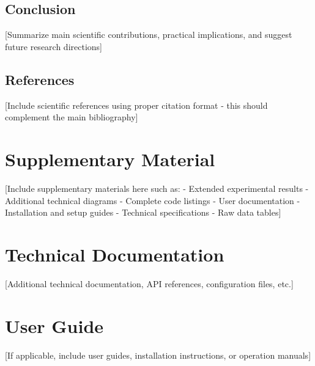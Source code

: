 \documentclass[11pt,a4paper,oneside]{book}
\begin{document}
\begin{multicols}{2}
\section{Conclusion}
[Summarize main scientific contributions, practical implications, and suggest future research directions]

\section{References}
[Include scientific references using proper citation format - this should complement the main bibliography]

\end{multicols}

\newpage
\appendix
\renewcommand{\thepage}{A-\arabic{page}}
\setcounter{page}{1}

\chapter{Supplementary Material}

[Include supplementary materials here such as:
- Extended experimental results
- Additional technical diagrams
- Complete code listings
- User documentation
- Installation and setup guides
- Technical specifications
- Raw data tables]

\listoffigures

\listoftables

\chapter{Technical Documentation}
[Additional technical documentation, API references, configuration files, etc.]

\chapter{User Guide}
[If applicable, include user guides, installation instructions, or operation manuals]
\end{document}
